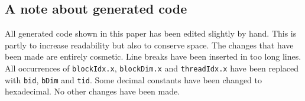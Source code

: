 \subsection{A note about generated code} 

All generated code shown in this paper has been edited slightly by hand. This 
is partly to increase readability but also to conserve space. The changes 
that have been made are entirely cosmetic. Line breaks have been inserted in too
long lines. All occurrences of {\tt blockIdx.x}, {\tt blockDim.x} and 
{\tt threadIdx.x} have been replaced with {\tt bid}, {\tt bDim} and {\tt tid}.
Some decimal constants have been changed to hexadecimal.
No other changes have been made. 


